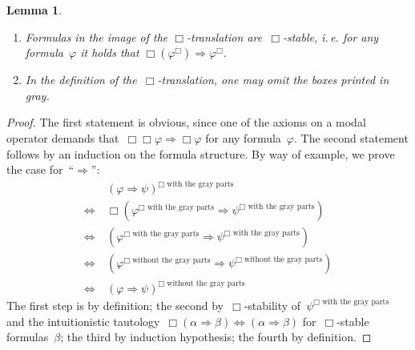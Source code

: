 \documentclass[10pt]{amsart}
\makeatletter
\theoremstyle{definition}
\theoremstyle{plain}
\newtheorem{lemma}[defn]{Lemma}
\theoremstyle{remark}
\newcommand{\?}{\,{:}\,}
\renewcommand{\_}{\mathpunct{.}\,}
\newcommand{\ie}{i.\,e.\@\xspace}
\makeatother
\begin{document}
\begin{lemma}\begin{enumerate}
\item Formulas in the image of the $\Box$-translation are~$\Box$-stable,
\ie for any formula~$\varphi$ it holds that
$\Box(\varphi^\Box) \Longrightarrow \varphi^\Box$.
\item In the definition of the~$\Box$-translation, one may omit the boxes
printed in gray.
\end{enumerate}\end{lemma}
\begin{proof}The first statement is obvious, since one of the axioms on a modal
operator demands that~$\Box\Box\varphi \Rightarrow \Box\varphi$ for any
formula~$\varphi$. The second statement follows by an induction on the
formula structure. By way of example, we prove the case for~``$\Rightarrow$'':
\newcommand{\withgray}{\text{$\Box$ with the gray parts}}
\newcommand{\withoutgray}{\text{$\Box$ without the gray parts}}
\begin{align*}
  &\ (\varphi \Rightarrow \psi)^\withgray \\
  \Longleftrightarrow &\ \Box(\varphi^\withgray \Rightarrow \psi^\withgray) \\
  \Longleftrightarrow &\ (\varphi^\withgray \Rightarrow \psi^\withgray) \\
  \Longleftrightarrow &\ (\varphi^\withoutgray \Rightarrow \psi^\withoutgray) \\
  \Longleftrightarrow &\ (\varphi \Rightarrow \psi)^\withoutgray
\end{align*}
The first step is by definition; the second by~$\Box$-stability
of~$\psi^\withgray$ and the intuitionistic tautology~$\Box(\alpha \Rightarrow
\beta) \Leftrightarrow (\alpha \Rightarrow \beta)$ for~$\Box$-stable
formulas~$\beta$; the third by induction hypothesis; the fourth by
definition.
\end{proof}
\end{document}
